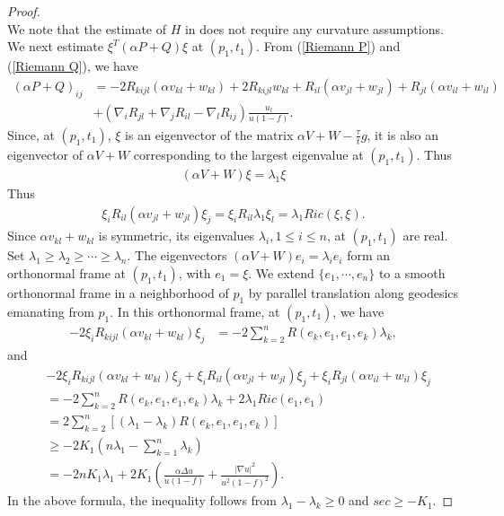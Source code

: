 \documentclass{amsart}
\theoremstyle{definition}
\theoremstyle{remark}
\numberwithin{equation}{section}
\begin{document}
\begin{proof}
\begin{equation}
\end{equation}
We note that the estimate of $H$ in \cite{Han-Zhang} does not require any curvature assumptions.
We next estimate $\xi^{T}(\alpha P+Q)\xi$ at $(p_{1},t_{1})$. From (\ref{Riemann P}) and (\ref{Riemann Q}), we have
\begin{align}\label{alpha P+Q Riemann}
(\alpha P+Q)_{ij}&=-2 R_{kijl}(\alpha v_{kl}+w_{kl})+2R_{kijl}w_{kl}+R_{il}(\alpha v_{jl}+w_{jl})+R_{jl}(\alpha v_{il}+w_{il})\nonumber\\
&+(\nabla_{i}R_{jl}+\nabla_{j}R_{il}-\nabla_{l}R_{ij})\frac{u_{l}}{u(1-f)}.
\end{align}
Since, at $(p_{1},t_{1})$, $\xi$ is an eigenvector of the matrix $\alpha V+W-\frac{\tau}{t}g$, it is also an eigenvector of $\alpha V+W$ corresponding to the largest eigenvalue at $(p_1,t_1)$. Thus
\begin{align}
(\alpha V+W)\xi=\lambda_1 \xi
\end{align}
Thus
\begin{align}
\xi_{i}R_{il}(\alpha v_{jl}+w_{jl})\xi_{j}=\xi_{i}R_{il}\lambda_{1} \xi_{l}=\lambda_{1} Ric(\xi,\xi).
\end{align}
Since $\alpha v_{kl}+w_{kl}$ is symmetric, its eigenvalues $\lambda_{i}, 1\leq i\leq n$, at $(p_{1},t_{1})$ are real. Set $\lambda_{1}\geq \lambda_{2}\geq \cdots\geq \lambda_{n}$. The eigenvectors $(\alpha V+W)e_{i}=\lambda_{i}e_{i}$ form an orthonormal frame at $(p_{1},t_{1})$, with $e_{1}=\xi$. We extend $\{e_{1},\cdots,e_{n}\}$ to a smooth orthonormal frame in a neighborhood of $p_{1}$ by parallel translation along geodesics emanating from $p_{1}$. In this orthonormal frame, at $(p_{1},t_{1})$, we have 
\begin{align}
-2\xi_{i}R_{kijl}(\alpha v_{kl}+w_{kl})\xi_{j}&=-2\sum_{k=2}^{n}R(e_{k},e_{1},e_{1},e_{k})\lambda_{k},
\end{align}
and
\begin{align}\label{v term}
&-2\xi_{i}R_{kijl}(\alpha v_{kl}+w_{kl})\xi_{j}+\xi_{i}R_{il}(\alpha v_{jl}+w_{jl})\xi_{j}+\xi_{i}R_{jl}(\alpha v_{il}+w_{il})\xi_{j}\nonumber\\
&=-2\sum_{k=2}^{n}R(e_{k},e_{1},e_{1},e_{k})\lambda_{k}+2\lambda_{1}Ric(e_{1},e_{1})\nonumber\\
&=2\sum_{k=2}^{n}[(\lambda_{1}-\lambda_{k})R(e_{k},e_{1},e_{1},e_{k})]\nonumber\\
&\geq -2K_{1}(n\lambda_{1}-\sum_{k=1}^{n}\lambda_{k})\nonumber\\
&=-2nK_{1}\lambda_{1}+2K_{1}(\frac{\alpha \Delta u}{u(1-f)}+\frac{|\nabla u|^{2}}{u^{2}(1-f)^{2}}).
\end{align}
In the above formula, the inequality follows from $\lambda_{1}-\lambda_{k}\geq 0$ and $sec\geq -K_{1}$.


\end{proof}
\end{document}
